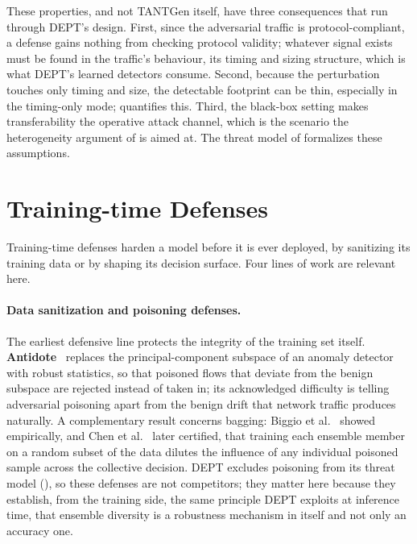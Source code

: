 These properties, and not TANTGen itself, have three consequences that run through DEPT's design.
First, since the adversarial traffic is protocol-compliant, a defense
gains nothing from checking protocol validity; whatever signal exists must be found in
the traffic's behaviour, its timing and sizing structure, which is what DEPT's
learned detectors consume. Second, because the perturbation touches only timing and
size, the detectable footprint can be thin, especially in the timing-only mode;
 quantifies this. Third, the black-box setting
makes transferability the operative attack channel, which is the scenario the
heterogeneity argument of  is aimed at. The threat
model of  formalizes these assumptions.

\section{Training-time Defenses}\label{sec:rel-training}
Training-time defenses harden a model before it is ever deployed, by sanitizing its
training data or by shaping its decision surface. Four lines of work are relevant
here.

\paragraph{Data sanitization and poisoning defenses.}
The earliest defensive line protects the integrity of the training set itself.
\textbf{Antidote}~\cite{rubinstein2009antidote} replaces the principal-component
subspace of an anomaly detector with robust statistics, so that poisoned flows that
deviate from the benign subspace are rejected instead of taken in; its acknowledged
difficulty is telling adversarial poisoning apart from the benign drift that network traffic produces naturally. A complementary result concerns
bagging: Biggio et al.~\cite{biggio2011bagging} showed empirically, and Chen et
al.~\cite{chen2022collective} later certified, that training each ensemble member on a
random subset of the data dilutes the influence of any individual poisoned sample
across the collective decision. DEPT excludes poisoning from its threat model
(), so these defenses are not competitors; they matter here
because they establish, from the training side, the same principle DEPT exploits at
inference time, that ensemble diversity is a robustness mechanism in itself and not only an
accuracy one.

